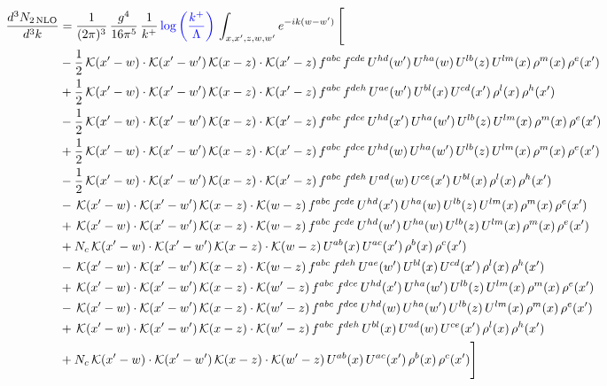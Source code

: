 \documentclass[9pt]{article}
\numberwithin{equation}{section}
\begin{document}
\begin{align}
\frac{d^{3}N_{2\,\mathrm{NLO}}}{d^{3}k} & = \frac{1}{(2\pi)^{3}}\,\frac{g^{4}}{16\pi^{5}}\,\frac{1}{k^{+}}\,{\color{blue}\log{\left(\frac{k^{+}}{\Lambda}\right)}}\,\int_{x,x',z,w,w'}e^{-ik(w-w')}\,\Bigg[\notag\\ & -\frac{1}{2}\,\mathcal{K}(x'-w)\cdot\mathcal{K}(x'-w')\,\mathcal{K}(x-z)\cdot\mathcal{K}(x'-z)\,f^{abc}\,f^{cde}\,U^{hd}(w')\,U^{ha}(w)\,U^{lb}(z)\,U^{lm}(x)\,\rho^{m}(x)\,\rho^{e}(x')\notag\\
& +\frac{1}{2}\,\mathcal{K}(x'-w)\cdot\mathcal{K}(x'-w')\,\mathcal{K}(x-z)\cdot\mathcal{K}(x'-z)\,f^{abc}\,f^{deh}\,U^{ae}(w')\,U^{bl}(x)\,U^{cd}(x')\,\rho^{l}(x)\,\rho^{h}(x')\notag\\
& -\frac{1}{2}\,\mathcal{K}(x'-w)\cdot\mathcal{K}(x'-w')\,\mathcal{K}(x-z)\cdot\mathcal{K}(x'-z)\,f^{abc}\,f^{dce}\,U^{hd}(x')\,U^{ha}(w')\,U^{lb}(z)\,U^{lm}(x)\,\rho^{m}(x)\,\rho^{e}(x')\notag\\
& +\frac{1}{2}\,\mathcal{K}(x'-w)\cdot\mathcal{K}(x'-w')\,\mathcal{K}(x-z)\cdot\mathcal{K}(x'-z)\,f^{abc}\,f^{dce}\,U^{hd}(w)\,U^{ha}(w')\,U^{lb}(z)\,U^{lm}(x)\,\rho^{m}(x)\,\rho^{e}(x')\notag\\
& -\frac{1}{2}\,\mathcal{K}(x'-w)\cdot\mathcal{K}(x'-w')\,\mathcal{K}(x-z)\cdot\mathcal{K}(x'-z)\,f^{abc}\,f^{deh}\,U^{ad}(w)\,U^{ce}(x')\,U^{bl}(x)\,\rho^{l}(x)\,\rho^{h}(x')\notag\\
& -\,\mathcal{K}(x'-w)\cdot\mathcal{K}(x'-w')\,\mathcal{K}(x-z)\cdot\mathcal{K}(w-z)\,f^{abc}\,f^{cde}\,U^{hd}(x')\,U^{ha}(w)\,U^{lb}(z)\,U^{lm}(x)\,\rho^{m}(x)\,\rho^{e}(x') \notag \\ &  +\,\mathcal{K}(x'-w)\cdot\mathcal{K}(x'-w')\,\mathcal{K}(x-z)\cdot\mathcal{K}(w-z)\,f^{abc}\,f^{cde}\,U^{hd}(w')\,U^{ha}(w)\,U^{lb}(z)\,U^{lm}(x)\,\rho^{m}(x)\,\rho^{e}(x')\notag\\
& +N_{c}\,\mathcal{K}(x'-w)\cdot\mathcal{K}(x'-w')\,\mathcal{K}(x-z)\cdot\mathcal{K}(w-z)\,U^{ab}(x)\,U^{ac}(x')\,\rho^{b}(x)\,\rho^{c}(x')\notag\\
& -\,\mathcal{K}(x'-w)\cdot\mathcal{K}(x'-w')\,\mathcal{K}(x-z)\cdot\mathcal{K}(w-z)\,f^{abc}\,f^{deh}\,U^{ae}(w')\,U^{bl}(x)\,U^{cd}(x')\,\rho^{l}(x)\,\rho^{h}(x')\notag\\
& +\,\mathcal{K}(x'-w)\cdot\mathcal{K}(x'-w')\,\mathcal{K}(x-z)\cdot\mathcal{K}(w'-z)\,f^{abc}\,f^{dce}\,U^{hd}(x')\,U^{ha}(w')\,U^{lb}(z)\,U^{lm}(x)\,\rho^{m}(x)\,\rho^{e}(x')\notag\\
& -\,\mathcal{K}(x'-w)\cdot\mathcal{K}(x'-w')\,\mathcal{K}(x-z)\cdot\mathcal{K}(w'-z)\,f^{abc}\,f^{dce}\,U^{hd}(w)\,U^{ha}(w')\,U^{lb}(z)\,U^{lm}(x)\,\rho^{m}(x)\,\rho^{e}(x')\notag\\
& +\,\mathcal{K}(x'-w)\cdot\mathcal{K}(x'-w')\,\mathcal{K}(x-z)\cdot\mathcal{K}(w'-z)\,f^{abc}\,f^{deh}\,U^{bl}(x)\,U^{ad}(w)\,U^{ce}(x')\,\rho^{l}(x)\,\rho^{h}(x')\notag\\
& +N_{c}\,\mathcal{K}(x'-w)\cdot\mathcal{K}(x'-w')\,\mathcal{K}(x-z)\cdot\mathcal{K}(w'-z)\,U^{ab}(x)\,U^{ac}(x')\,\rho^{b}(x)\,\rho^{c}(x')\Bigg]
\end{align}
\end{document}
